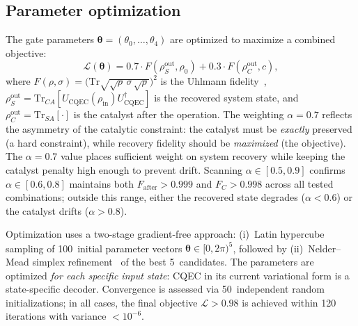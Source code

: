 \documentclass[a4paper,twocolumn]{quantumarticle}
\begin{document}
\subsection{Parameter optimization}
\label{sec:optimization}

The gate parameters $\boldsymbol{\theta} = (\theta_0, \ldots, \theta_4)$ are optimized to maximize a combined objective:
\begin{equation}
\mathcal{L}(\boldsymbol{\theta}) = 0.7 \cdot F(\rho_S^\mathrm{out}, \rho_0) + 0.3 \cdot F(\rho_C^\mathrm{out}, c),
\label{eq:objective}
\end{equation}
where $F(\rho, \sigma) = \bigl(\mathrm{Tr}\sqrt{\sqrt{\rho}\,\sigma\,\sqrt{\rho}}\bigr)^2$ is the Uhlmann fidelity~\cite{Jozsa1994}, $\rho_S^\mathrm{out} = \mathrm{Tr}_{CA}[U_\mathrm{CQEC}(\rho_\mathrm{in})U_\mathrm{CQEC}^\dagger]$ is the recovered system state, and $\rho_C^\mathrm{out} = \mathrm{Tr}_{SA}[\cdot]$ is the catalyst after the operation.
The weighting $\alpha = 0.7$ reflects the asymmetry of the catalytic constraint: the catalyst must be \emph{exactly} preserved (a hard constraint), while recovery fidelity should be \emph{maximized} (the objective).
The $\alpha = 0.7$ value places sufficient weight on system recovery while keeping the catalyst penalty high enough to prevent drift.
Scanning $\alpha \in [0.5, 0.9]$ confirms $\alpha \in [0.6, 0.8]$ maintains both $F_\mathrm{after} > 0.999$ and $F_C > 0.998$ across all tested combinations; outside this range, either the recovered state degrades ($\alpha < 0.6$) or the catalyst drifts ($\alpha > 0.8$).

Optimization uses a two-stage gradient-free approach: (i)~Latin hypercube sampling of 100~initial parameter vectors $\boldsymbol{\theta} \in [0, 2\pi)^5$, followed by (ii)~Nelder--Mead simplex refinement~\cite{NelderMead1965} of the best 5~candidates.
The parameters are optimized \emph{for each specific input state}: CQEC in its current variational form is a state-specific decoder.
Convergence is assessed via 50~independent random initializations; in all cases, the final objective $\mathcal{L} > 0.98$ is achieved within 120 iterations with variance $< 10^{-6}$.
\end{document}
